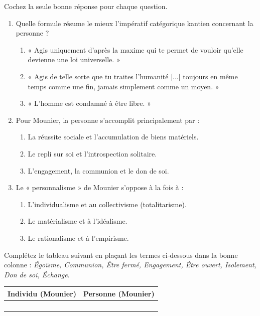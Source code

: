 \documentclass[11pt]{article}
\begin{document}
\begin{exercice}
Cochez la seule bonne réponse pour chaque question.
\begin{enumerate}
    \item Quelle formule résume le mieux l'impératif catégorique kantien concernant la personne ?
    \begin{enumerate}
        \item « Agis uniquement d'après la maxime qui te permet de vouloir qu'elle devienne une loi universelle. »
        \item « Agis de telle sorte que tu traites l'humanité [...] toujours en même temps comme une fin, jamais simplement comme un moyen. »
        \item « L'homme est condamné à être libre. »
    \end{enumerate}
    \item Pour Mounier, la personne s'accomplit principalement par :
    \begin{enumerate}
        \item La réussite sociale et l'accumulation de biens matériels.
        \item Le repli sur soi et l'introspection solitaire.
        \item L'engagement, la communion et le don de soi.
    \end{enumerate}
    \item Le « personnalisme » de Mounier s'oppose à la fois à :
    \begin{enumerate}
        \item L'individualisme et au collectivisme (totalitarisme).
        \item Le matérialisme et à l'idéalisme.
        \item Le rationalisme et à l'empirisme.
    \end{enumerate}
\end{enumerate}
\end{exercice}

\begin{exercice}
Complétez le tableau suivant en plaçant les termes ci-dessous dans la bonne colonne : \textit{Égoïsme, Communion, Être fermé, Engagement, Être ouvert, Isolement, Don de soi, Échange}.
\begin{center}
\begin{tabular}{|l|l|}
\hline
\textbf{Individu (Mounier)} & \textbf{Personne (Mounier)} \\
\hline
 &  \\
\hline
 &  \\
\hline
 &  \\
\hline
 &  \\
\hline
\end{tabular}
\end{center}
\end{exercice}
\end{document}
